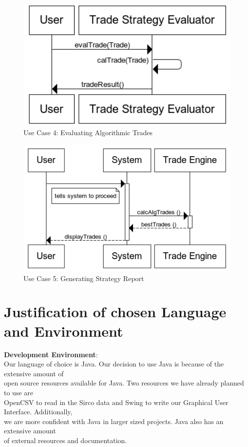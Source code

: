 \documentclass[a4paper]{article}
\begin{document}
\begin{figure}[H]
   \includegraphics[width=1\textwidth]{images/authenticationSeq}
   \caption{Use Case 4: Evaluating Algorithmic Trades}
\end{figure}

\begin{figure}[H]
   \includegraphics[width=1\textwidth]{images/generatingTrades}
   \caption{Use Case 5: Generating Strategy Report}
\end{figure}

\newpage

\section {Justification of chosen Language and Environment}

{\bf Development Environment}: \\
\indent Our language of choice is Java. Our decision to use Java is because of the extensive amount of \\ 
open source resources available for Java. Two resources we have already planned to use are \\
OpenCSV to read in the Sirco data and Swing to write our Graphical User Interface. Additionally, \\
we are more confident with Java in larger sized projects. Java also has an extensive amount  \\
of external resources and documentation. \\
\end{document}
